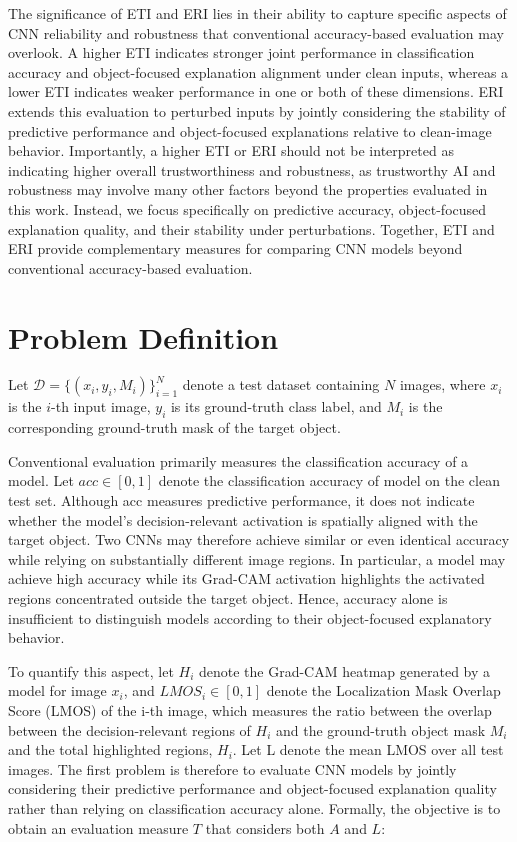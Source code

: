 \documentclass[a4paper,fleqn]{cas-dc}
\begin{document}
The significance of ETI and ERI lies in their ability to capture specific aspects of CNN reliability and robustness that conventional accuracy-based evaluation may overlook. A higher ETI indicates stronger joint performance in classification accuracy and object-focused explanation alignment under clean inputs, whereas a lower ETI indicates weaker performance in one or both of these dimensions. ERI extends this evaluation to perturbed inputs by jointly considering the stability of predictive performance and object-focused explanations relative to clean-image behavior. Importantly, a higher ETI or ERI should not be interpreted as indicating higher overall trustworthiness and robustness, as trustworthy AI and robustness may involve many other factors beyond the properties evaluated in this work. Instead, we focus specifically on predictive accuracy, object-focused explanation quality, and their stability under perturbations. Together, ETI and ERI provide complementary measures for comparing CNN models beyond conventional accuracy-based evaluation.


\section{Problem Definition}

Let \(\mathcal{D}=\{(x_i,y_i,M_i)\}_{i=1}^{N}\) denote a test dataset containing \(N\) images, where \(x_i\) is the \(i\)-th input image, \(y_i\) is its ground-truth class label, and \(M_i\) is the corresponding ground-truth mask of the target object. %

Conventional evaluation primarily measures the classification accuracy of a model. Let \(acc\in[0,1]\) denote the classification accuracy of model %
on the clean test set. Although acc measures predictive performance, it does not indicate whether the model's decision-relevant activation is spatially aligned with the target object. Two CNNs may therefore achieve similar or even identical accuracy while relying on substantially different image regions. In particular, a model may achieve high accuracy while its Grad-CAM activation highlights the activated regions concentrated outside the target object. Hence, accuracy alone is insufficient to distinguish models according to their object-focused explanatory behavior.

To quantify this aspect, let \(H_{i}\) denote the Grad-CAM heatmap generated by a model for image \(x_i\), and \(LMOS_{i} \in[0,1]\) denote the Localization Mask Overlap Score (LMOS) of the i-th image, which measures the ratio between the overlap between the decision-relevant regions of \(H_{i}\) and the ground-truth object mask \(M_i\) and the total highlighted regions, \(H_{i}\). Let L denote the mean LMOS over all test images. The first problem is therefore to evaluate CNN models by jointly considering their predictive performance and object-focused explanation quality rather than relying on classification accuracy alone. Formally, the objective is to obtain an evaluation measure \(T\) that considers both \(A\) and \(L\):
\end{document}
